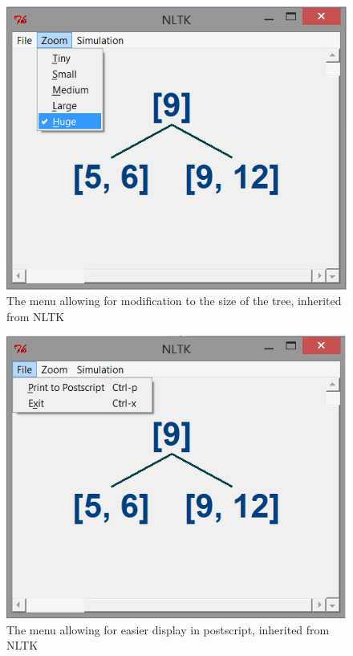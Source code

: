 \documentclass[fleqn]{article}
\begin{document}
\begin{figure}[h]
\centerline{\includegraphics{Images/gui4.png}}
\caption{The menu allowing for modification to the size of the tree, inherited from NLTK}
\end{figure}

\begin{figure}[h]
\centerline{\includegraphics{Images/gui3.png}}
\caption{The menu allowing for easier display in postscript, inherited from NLTK}
\end{figure}
\end{document}

